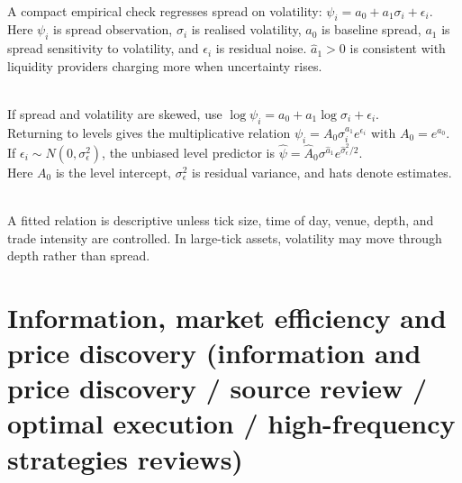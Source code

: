 \documentclass[a4paper,oneside,openany]{book}
\begin{document}
\begin{model} \\
A compact empirical check regresses spread on volatility: $\psi_i=a_0+a_1\sigma_i+\epsilon_i$.\\
Here $\psi_i$ is spread observation, $\sigma_i$ is realised volatility, $a_0$ is baseline spread, $a_1$ is spread sensitivity to volatility, and $\epsilon_i$ is residual noise. $\hat{a}_1 > 0$ is consistent with liquidity providers charging more when uncertainty rises.
\end{model}

\begin{model} \\
If spread and volatility are skewed, use $\log \psi_i=a_0+a_1\log\sigma_i+\epsilon_i$.\\
Returning to levels gives the multiplicative relation $\psi_i=A_0\sigma_i^{a_1}e^{\epsilon_i}$ with $A_0=e^{a_0}$. If $\epsilon_i\sim N(0,\sigma_\epsilon^2)$, the unbiased level predictor is $\hat{\psi}= \hat{A}_0\sigma^{\hat{a}_1}e^{\hat{\sigma}_\epsilon^2/2}$.\\
Here $A_0$ is the level intercept, $\sigma_\epsilon^2$ is residual variance, and hats denote estimates.
\end{model}

\begin{caveat} \\
A fitted relation is descriptive unless tick size, time of day, venue, depth, and trade intensity are controlled. In large-tick assets, volatility may move through depth rather than spread.
\end{caveat}

\section*{Information, market efficiency and price discovery (information and price discovery / source review / optimal execution / high-frequency strategies reviews)}
\end{document}
